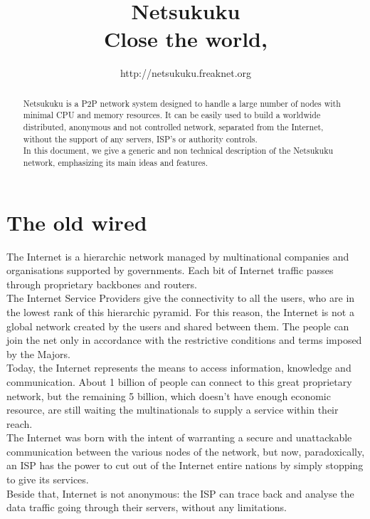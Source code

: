 \documentclass[a4paper]{article}
\title{Netsukuku\\
{\small Close the world, \reflectbox{Open the next}}}
\author{http://netsukuku.freaknet.org}
\begin{document}
\maketitle

\begin{abstract}
Netsukuku is a P2P network system designed to handle a large number of nodes
with minimal CPU and memory resources. It can be easily used to build a
worldwide distributed, anonymous and not controlled network, separated from the
Internet, without the support of any servers, ISP's or authority controls.\\

In this document, we give a generic and non technical description of the
Netsukuku network, emphasizing its main ideas and features.
\end{abstract}


\section{The old wired}

The Internet is a hierarchic network managed by multinational companies and 
organisations supported by governments. Each bit of Internet traffic passes
through proprietary backbones and routers.\\

The Internet Service Providers give the connectivity to all the users, who
are in the lowest rank of this hierarchic pyramid. For this reason, the 
Internet is not a global network created by the users and shared between
them. The people can join the net only in accordance with the restrictive
conditions and terms imposed by the Majors.\\

Today, the Internet represents the means to access information, knowledge
and communication. About 1 billion of people can connect to this great
proprietary network, but the remaining 5 billion, which doesn't have enough
economic resource, are still waiting the multinationals to supply a service
within their reach.\\

The Internet was born with the intent of warranting a secure and
unattackable communication between the various nodes of the network, but
now, paradoxically, an ISP has the power to cut out of the Internet entire
nations by simply stopping to give its services.\\

Beside that, Internet is not anonymous: the ISP can trace back and analyse
the data traffic going through their servers, without any limitations.\\
\end{document}
